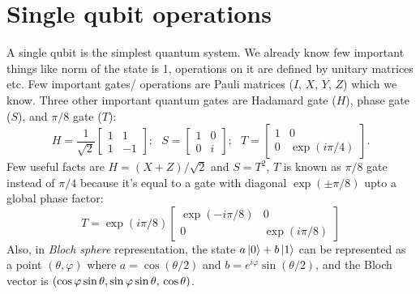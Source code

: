 \section{Single qubit operations}
A single qubit is the simplest quantum system. We already know few important things like norm of the state is 1, operations on it are defined by unitary matrices etc. Few important gates/ operations are Pauli matrices ($I$, $X$, $Y$, $Z$) which we know. Three other important quantum gates are Hadamard gate ($H$), phase gate ($S$), and $\pi/8$ gate ($T$):
\begin{equation}
    H = \frac{1}{\sqrt{2}}\begin{bmatrix}
        1 & 1 \\ 1 & -1
    \end{bmatrix};
    \ \ \ 
    S = \begin{bmatrix}
        1 & 0 \\ 0 & i
    \end{bmatrix};
    \ \ \ 
    T = \begin{bmatrix}
        1 & 0 \\ 0 & \exp{(i\pi/4)}
    \end{bmatrix}.
\end{equation}
Few useful facts are $H = (X+Z)/\sqrt{2}$ and $S=T^2$, $T$ is known as $\pi/8$ gate instead of $\pi/4$ because it's equal to a gate with diagonal $\exp{(\pm \pi/8)}$ upto a global phase factor:
\begin{equation}
    T = \exp{(i\pi/8)}\begin{bmatrix}
        \exp{(-i\pi/8)  } & 0 \\ 0 & \exp{(i\pi/8)}
    \end{bmatrix}
\end{equation}
Also, in \textit{Bloch sphere} representation, the state $a\ket{0}+b\ket{1}$ can be represented as a point $(\theta, \varphi)$ where $a=\cos{(\theta/2)}$ and $b=e^{i\varphi}\sin{(\theta/2)}$, and the Bloch vector is $(\cos{\varphi}\sin{\theta}, \sin{\varphi}\sin{\theta}, \\ \cos{\theta})$.

